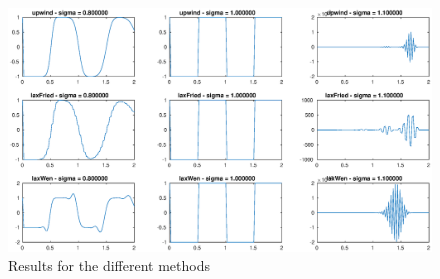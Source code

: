 \begin{figure}[!h]
\centering
\includegraphics[scale = 0.5]{./fig1.eps}
\caption{Results for the different methods}
\label{fig:1}
\end{figure}
\FloatBarrier